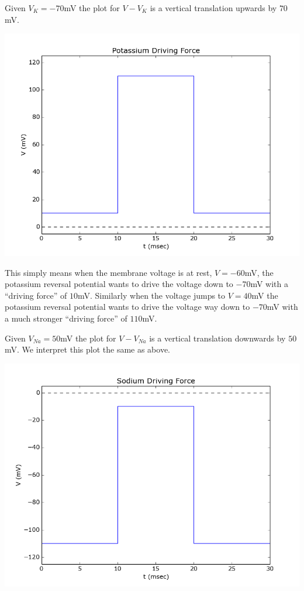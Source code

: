 \documentclass[letterpaper,10pt,english]{/usr/share/sphinx/texinputs/sphinxhowto}
\begin{document}
Given $V_K = -70$mV the plot for $V-V_K$ is a vertical translation
upwards by $70$mV.

\includegraphics[scale=.5]{vKforce.png}

This simply means when the membrane voltage is at rest, $V=-60$mV, the
potassium reversal potential wants to drive the voltage down to $-70$mV
with a ``driving force'' of $10$mV. Similarly when the voltage jumps to
$V=40$mV the potassium reversal potential wants to drive the voltage way
down to $-70$mV with a much stronger ``driving force'' of $110$mV.

Given $V_{Na} = 50$mV the plot for $V-V_{Na}$ is a vertical translation
downwards by $50$mV. We interpret this plot the same as above.

\includegraphics[scale=.5]{vNaforce.png}
\end{document}
